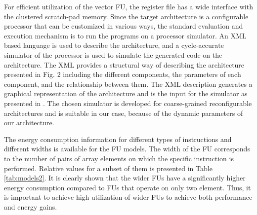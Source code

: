 \documentclass[prodmode,acmtecs]{acmsmall}
\begin{document}
For efficient utilization of the vector FU, the register file has a wide interface with the clustered scratch-pad memory. 
Since the target architecture is a configurable processor that can be customized in various ways, the standard evaluation and execution mechanism is to run the programs on a processor simulator. 
An XML based language is used to describe the architecture, and a cycle-accurate simulator of the processor is used to simulate the generated code on the architecture. The XML provides a structural way of describing the architecture presented in Fig. 2 including the different components, the parameters of each component, and the relationship between them. The XML description generates a graphical representation of the architecture and is the input for the simulator as presented in \cite{xml}. The chosen simulator is developed for coarse-grained reconfigurable architectures and is suitable in our case, because of the dynamic parameters of our architecture.
 
The energy consumption information for different types of instructions and different widths is available for the FU models.
The width of the FU corresponds to the number of pairs of array elements on which the specific instruction is performed.
Relative values for a subset of them is presented in Table \ref{tab:models2}. 
It is clearly shown that the wider FUs have a significantly higher energy consumption compared to FUs that operate on only two element.
Thus, it is important to achieve high utilization of wider FUs to achieve both performance and energy gains.

\begin{table}
\begin{tabnote}%
\end{tabnote}%
\end{table}
\end{document}
